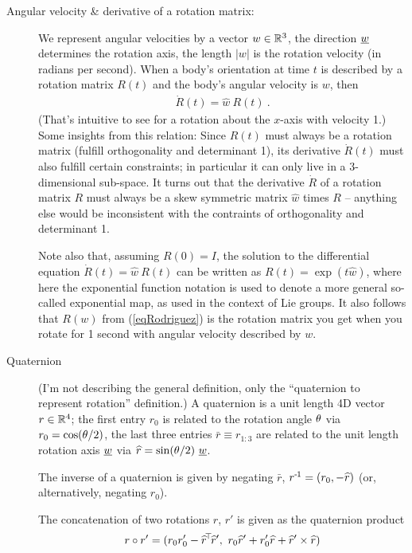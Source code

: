 \begin{description}
\item[Angular velocity \& derivative of a rotation matrix:] We
represent angular velocities by a vector $w\in{\mathbb{R}}^3$, the direction
$\underline w$ determines the rotation axis, the length $|w|$ is the rotation
velocity (in radians per second). When a body's orientation at time
$t$ is described by a rotation matrix $R(t)$ and the body's angular
velocity is $w$, then
\begin{align}\label{eqDotR}
\dot R(t) = \hat w~ R(t)~.
\end{align}
(That's intuitive to see for a rotation about the $x$-axis with
velocity 1.) Some insights from this relation: Since $R(t)$ must
always be a rotation matrix (fulfill orthogonality and determinant 1),
its derivative $\dot R(t)$ must also fulfill certain constraints; in
particular it can only live in a 3-dimensional sub-space. It turns out
that the derivative $\dot R$ of a rotation matrix $R$ must always be a
skew symmetric matrix $\hat w$ times $R$ -- anything else would be
inconsistent with the contraints of orthogonality and determinant 1.

Note also that, assuming $R(0)=I$, the solution to the differential
equation $\dot R(t) = \hat w~ R(t)$ can be written as
$R(t)=\exp(t \hat w)$, where here the exponential function notation
is used to denote a more general so-called exponential map, as used in
the context of Lie groups. It also follows that $R(w)$ from
(\ref{eqRodriguez}) is the rotation matrix you get when you rotate for
1 second with angular velocity described by $w$.

\item[Quaternion] (I'm not describing the general definition, only the
``quaternion to represent rotation'' definition.) A quaternion is a
unit length 4D vector $r\in{\mathbb{R}}^4$; the first entry $r_0$ is related
to the rotation angle $\theta$ via $r_0=\cos(\theta/2)$, the last three
entries $\bar r\equiv r_{1:3}$ are related to the unit length rotation
axis $\underline w$ via $\widehat r = \sin(\theta/2)~ \underline w$.

The inverse of a quaternion is given by negating $\bar r$, $r^{{\hspace*{-.0pt}\text{\rm -}\hspace*{-.5pt}}1} =
(r_0,-\widehat r)$ (or,
alternatively, negating $r_0$).

The concatenation of two rotations $r$, $r'$ is given as the quaternion
product
\begin{align}\label{eqQuat}
r \circ r'
 = (r_0 r'_0 - \widehat r^{\!\top\!} \widehat r',~
    r_0 \widehat r' + r'_0 \widehat r + \widehat r' \times \widehat r)
\end{align}


\end{description}
